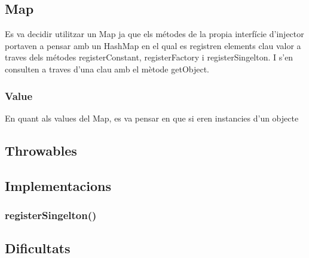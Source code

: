 
\subsection{Map}
Es va decidir utilitzar un Map ja que els métodes de la propia interfície d'injector portaven a pensar amb un HashMap en el qual es registren elements clau valor a traves dels métodes registerConstant, registerFactory i registerSingelton. I s'en consulten a traves d'una clau amb el mètode getObject.
\subsubsection{Value}
En quant als values del Map, es va  pensar en que si eren instancies d'un objecte 
\subsection{Throwables}
\subsection{Implementacions}
\subsubsection{registerSingelton()}
\subsection{Dificultats}


